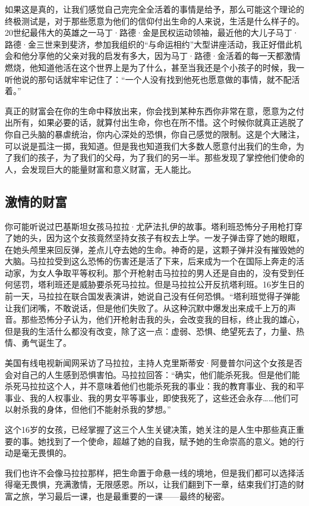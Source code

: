 如果这是真的，让我们感觉自己完完全全活着的事情是给予，那么可能这个理论的终极测试是，对于那些愿意为他们的信仰付出生命的人来说，生活是什么样子的。20世纪最伟大的英雄之一马丁·路德·金是民权运动领袖，最近他的大儿子马丁·路德·金三世来到斐济，参加我组织的“与命运相约”大型讲座活动，我正好借此机会和他分享他的父亲对我的启发有多大，因为马丁·路德·金活着的每一天都激情燃烧，他知道他活在这个世界上是为了什么，甚至当我还是个小孩子的时候，我一听他说的那句话就牢牢记住了：“一个人没有找到他死也愿意做的事情，就不配活着。”

真正的财富会在你的生命中释放出来，你会找到某种东西你非常在意，愿意为之付出所有，如果必要的话，就算付出生命，你也在所不惜。这个时候你就真正逃脱了你自己头脑的暴虐统治，你内心深处的恐惧，你自己感觉的限制。这是个大赌注，可以说是孤注一掷，我知道。但是我也知道我们大多数人愿意付出我们的生命，为了我们的孩子，为了我们的父母，为了我们的另一半。那些发现了掌控他们使命的人，会发现巨大的能量财富和意义财富，无人能比。

\subsection{激情的财富}

你可能听说过巴基斯坦女孩马拉拉·尤萨法扎伊的故事。塔利班恐怖分子用枪打穿了她的头，因为这个女孩竟然坚持女孩子有权去上学。一发子弹击穿了她的眼眶，在她头颅里来回反弹，差点儿夺去她的生命。神奇的是，这颗子弹并没有摧毁她的大脑。马拉拉受到这么恐怖的伤害还是活了下来，后来成为一个在国际上奔走的活动家，为女人争取平等权利。那个开枪射击马拉拉的男人还是自由的，没有受到任何惩罚，塔利班还是威胁要杀死马拉拉。但是马拉拉公开反抗塔利班。16岁生日的前一天，马拉拉在联合国发表演讲，她说自己没有任何恐惧。“塔利班觉得子弹能让我们闭嘴，不敢说话，但是他们失败了。从这种沉默中爆发出来成千上万的声音。那些恐怖分子认为，他们开枪射击我的头，会改变我的目标，终止我的雄心，但是我的生活什么都没有改变，除了这一点：虚弱、恐惧、绝望死去了，力量、热情、勇气诞生了。

美国有线电视新闻网采访了马拉拉，主持人克里斯蒂安·阿曼普尔问这个女孩是否会对自己的人生感到恐惧害怕。马拉拉回答：“确实，他们能杀死我。但是他们能杀死马拉拉这个人，并不意味着他们也能杀死我的事业：我的教育事业、我的和平事业、我的人权事业、我的男女平等事业，即使我死了，这些还会永存……他们可以射杀我的身体，但他们不能射杀我的梦想。”

这个16岁的女孩，已经掌握了这三个人生关键决策，她关注的是人生中那些真正重要的事。她找到了一个使命，超越了她的自我，赋予她的生命崇高的意义。她的行动是毫无畏惧的。

我们也许不会像马拉拉那样，把生命置于命悬一线的境地，但是我们都可以选择活得毫无畏惧，充满激情，无限感恩。所以，让我们翻到下一章，结束我们打造的财富之旅，学习最后一课，也是最重要的一课——最终的秘密。
